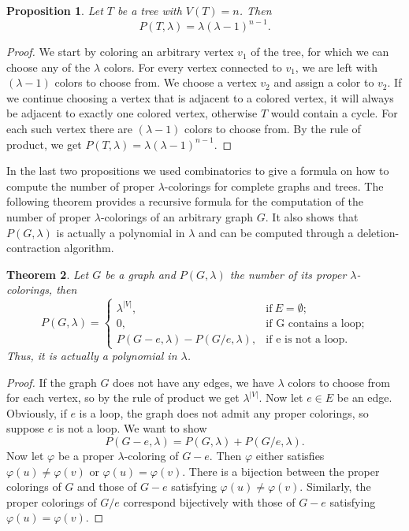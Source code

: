 \documentclass[12pt,a4paper, twoside, autooneside=false]{scrartcl}
\newtheorem{theorem}{Theorem}[section]
\newtheorem{proposition}[theorem]{Proposition}
\theoremstyle{definition}
\theoremstyle{remark}
\numberwithin{equation}{section}
\begin{document}
\begin{proposition}
Let $T$ be a tree with $V(T) = n$. Then 
\[
P(T, \lambda) = \lambda (\lambda - 1)^{n - 1}.
\]
\end{proposition}
\begin{proof}We start by coloring an arbitrary vertex $v_1$ of the tree, for which we can choose any of the $\lambda$ colors. For every vertex connected to $v_1$, we are left with $(\lambda - 1)$ colors to choose from. We choose a vertex $v_2$ and assign a color to $v_2$. If we continue choosing a vertex that is adjacent to a colored vertex, it will always be adjacent to exactly one colored vertex, otherwise $T$ would contain a cycle. For each such vertex there are $(\lambda - 1)$ colors to choose from. By the rule of product, we get $ P(T, \lambda) = \lambda (\lambda - 1)^{n - 1}$. 
\end{proof}
In the last two propositions we used combinatorics to give a formula on how to compute the number of proper $\lambda$-colorings for complete graphs and trees. The following theorem provides a recursive formula for the computation of the number of proper $\lambda$-colorings of an arbitrary graph $G$. It also shows that $P(G, \lambda)$ is actually a polynomial in $\lambda$ and can be computed through a deletion-contraction algorithm.
\begin{theorem}
Let $G$ be a graph and $P(G, \lambda)$ the number of its proper $\lambda$-colorings, then 
\[
P(G,\lambda) = \begin{cases}
\lambda^{|V|}, & \text{if} \  E = \emptyset; \\
0, & \text{if G contains a loop;} \\
P(G -  e, \lambda) - P(G/e,\lambda), & \text{if e is not a loop.}
\end{cases}
\]
Thus, it is actually a polynomial in $\lambda$. 
\end{theorem}
\begin{proof}
If the graph $G$ does not have any edges, we have $\lambda$ colors to choose from for each vertex, so by the rule of product we get $\lambda^{|V|}$. Now let $e \in E$ be an edge. Obviously, if $e$ is a loop, the graph does not admit any proper colorings, so suppose $e$ is not a loop. We want to show 
\[
P(G - e, \lambda) = P(G, \lambda) + P(G/e, \lambda).
\]
Now let $\varphi$ be a proper $\lambda$-coloring of $G - e$. Then $\varphi$ either satisfies $\varphi(u) \neq \varphi(v)$ or $\varphi(u) = \varphi(v)$. There is a bijection between the proper colorings of $G$ and those of $G - e$ satisfying $\varphi(u) \neq \varphi(v)$. Similarly, the proper colorings of $G / e$ correspond bijectively with those of $G - e$ satisfying $\varphi(u) = \varphi(v)$.
\end{proof}
\end{document}
